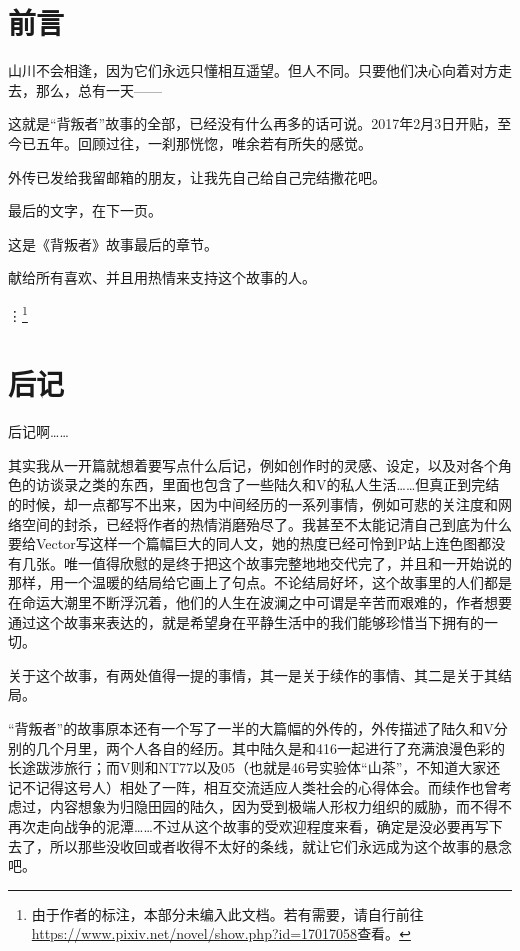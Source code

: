 
\section*{前言}

山川不会相逢，因为它们永远只懂相互遥望。但人不同。只要他们决心向着对方走去，那么，总有一天——

\lineseparator

这就是“背叛者”故事的全部，已经没有什么再多的话可说。2017年2月3日开贴，至今已五年。回顾过往，一刹那恍惚，唯余若有所失的感觉。

外传已发给我留邮箱的朋友，让我先自己给自己完结撒花吧。

最后的文字，在下一页。

\clearpage

这是《背叛者》故事最后的章节。

献给所有喜欢、并且用热情来支持这个故事的人。

\vdots\footnote{由于作者的标注，本部分未编入此文档。若有需要，请自行前往\url{https://www.pixiv.net/novel/show.php?id=17017058}查看。}

\clearpage

\section*{后记}



后记啊……

其实我从一开篇就想着要写点什么后记，例如创作时的灵感、设定，以及对各个角色的访谈录之类的东西，里面也包含了一些陆久和V的私人生活……但真正到完结的时候，却一点都写不出来，因为中间经历的一系列事情，例如可悲的关注度和网络空间的封杀，已经将作者的热情消磨殆尽了。我甚至不太能记清自己到底为什么要给Vector写这样一个篇幅巨大的同人文，她的热度已经可怜到P站上连色图都没有几张。唯一值得欣慰的是终于把这个故事完整地地交代完了，并且和一开始说的那样，用一个温暖的结局给它画上了句点。不论结局好坏，这个故事里的人们都是在命运大潮里不断浮沉着，他们的人生在波澜之中可谓是辛苦而艰难的，作者想要通过这个故事来表达的，就是希望身在平静生活中的我们能够珍惜当下拥有的一切。

关于这个故事，有两处值得一提的事情，其一是关于续作的事情、其二是关于其结局。

“背叛者”的故事原本还有一个写了一半的大篇幅的外传的，外传描述了陆久和V分别的几个月里，两个人各自的经历。其中陆久是和416一起进行了充满浪漫色彩的长途跋涉旅行；而V则和NT77以及05（也就是46号实验体“山茶”，不知道大家还记不记得这号人）相处了一阵，相互交流适应人类社会的心得体会。而续作也曾考虑过，内容想象为归隐田园的陆久，因为受到极端人形权力组织的威胁，而不得不再次走向战争的泥潭……不过从这个故事的受欢迎程度来看，确定是没必要再写下去了，所以那些没收回或者收得不太好的条线，就让它们永远成为这个故事的悬念吧。

